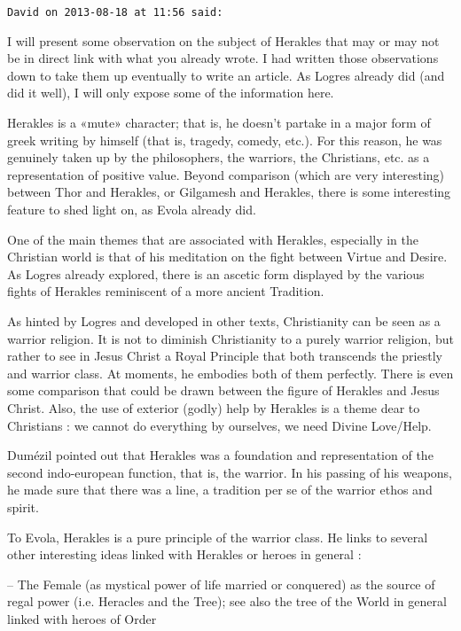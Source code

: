 \begin{footnotesize}
\begin{sffamily}
\hfill

\texttt{David on 2013-08-18 at 11:56 said:}

I will present some observation on the subject of Herakles that may or may not be in direct link with what you already wrote. I had written those observations down to take them up eventually to write an article. As Logres already did (and did it well), I will only expose some of the information here.

Herakles is a «mute» character; that is, he doesn't partake in a major form of greek writing by himself (that is, tragedy, comedy, etc.). For this reason, he was genuinely taken up by the philosophers, the warriors, the Christians, etc. as a representation of positive value. Beyond comparison (which are very interesting) between Thor and Herakles, or Gilgamesh and Herakles, there is some interesting feature to shed light on, as Evola already did.

One of the main themes that are associated with Herakles, especially in the Christian world is that of his meditation on the fight between Virtue and Desire. As Logres already explored, there is an ascetic form displayed by the various fights of Herakles reminiscent of a more ancient Tradition.

As hinted by Logres and developed in other texts, Christianity can be seen as a warrior religion. It is not to diminish Christianity to a purely warrior religion, but rather to see in Jesus Christ a Royal Principle that both transcends the priestly and warrior class. At moments, he embodies both of them perfectly. There is even some comparison that could be drawn between the figure of Herakles and Jesus Christ. Also, the use of exterior (godly) help by Herakles is a theme dear to Christians : we cannot do everything by ourselves, we need Divine Love/Help.

Dumézil pointed out that Herakles was a foundation and representation of the second indo-european function, that is, the warrior. In his passing of his weapons, he made sure that there was a line, a tradition per se of the warrior ethos and spirit.

To Evola, Herakles is a pure principle of the warrior class. He links to several other interesting ideas linked with Herakles or heroes in general :

-- The Female (as mystical power of life married or conquered) as the source of regal power (i.e. Heracles and the Tree); see also the tree of the World in general linked with heroes of Order


\end{sffamily}
\end{footnotesize}
